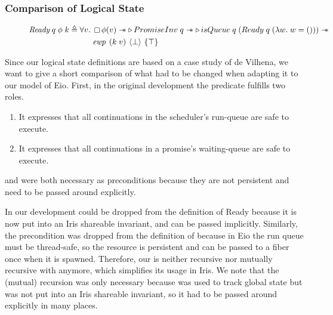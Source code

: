 

\subsubsection{Comparison of Logical State}
\label{sec:sched-spec-state-comparison}

\begin{figure}[ht]
  \begin{align*}
    \gsReady{}\; q\; \phi\; k \triangleq \forall v.\; & \always \phi(v) \wand \later PromiseInv\; q \wand \later isQueue\; q\; (Ready\; q\; (\lambda w.\; w = ())) \wand \\
                                                      & \ewp{k\; v}{\bot}{\top}
  \end{align*}
\end{figure}

Since our logical state definitions are based on a case study of de Vilhena, we want to give a short comparison of what had to be changed when adapting it to our model of Eio.
First, in the original development the \gsReady{} predicate fulfills two roles.
\begin{enumerate}
  \item It expresses that all continuations in the scheduler's run-queue are safe to execute.
  \item It expresses that all continuations in a promise's waiting-queue are safe to execute.
\end{enumerate}

\gsPInv{} and \gsIsQueue{} were both necessary as preconditions because they are not persistent and need to be passed around explicitly.

In our development \gsPInv{} could be dropped from the definition of Ready because it is now put into an Iris shareable invariant, and can be passed implicitly.
Similarly, the \gsIsQueue{} precondition was dropped from the definition of \gsReady{} because in Eio the run queue must be thread-safe, so the \gsIsQueue{} resource is persistent and can be passed to a fiber once when it is spawned.
Therefore, our \gsReady{} is neither recursive nor mutually recursive with \gsPInv{} anymore, which simplifies its usage in Iris.
We note that the (mutual) recursion was only necessary because \gsPInv{} was used to track global state but was not put into an Iris shareable invariant, so it had to be passed around explicitly in many places.


